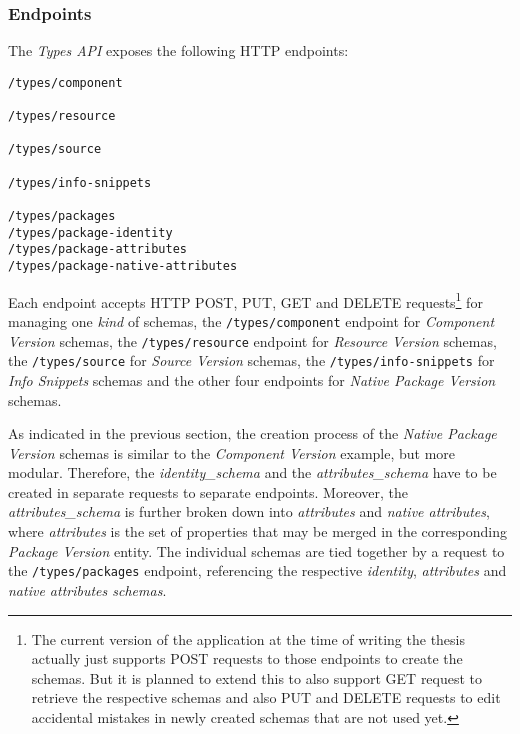 \subsubsection{Endpoints}
The \emph{Types API} exposes the following HTTP endpoints:\\

\begin{lstlisting}[caption=Types API Endpoints, captionpos=b, label=lst:TypesEndpoints]
/types/component

/types/resource

/types/source

/types/info-snippets

/types/packages
/types/package-identity
/types/package-attributes
/types/package-native-attributes
\end{lstlisting}

Each endpoint accepts HTTP POST, PUT, GET and DELETE requests\footnote{The current version of the application at the time of writing the thesis actually just supports POST requests to those endpoints to create the schemas. But it is planned to extend this to also support GET request to retrieve the respective schemas and also PUT and DELETE requests to edit accidental mistakes in newly created schemas that are not used yet.} for managing one \emph{kind} of schemas, the \lstinline|/types/component| endpoint for \emph{Component Version} schemas, the \lstinline|/types/resource| endpoint for \emph{Resource Version} schemas, the \lstinline|/types/source| for \emph{Source Version} schemas, the \lstinline|/types/info-snippets| for \emph{Info Snippets} schemas and the other four endpoints for \emph{Native Package Version} schemas.\par
As indicated in the previous section, the creation process of the \emph{Native Package Version} schemas is similar to the \emph{Component Version} example, but more modular. Therefore, the \emph{identity\_schema} and the \emph{attributes\_schema} have to be created in separate requests to separate endpoints. Moreover, the \emph{attributes\_schema} is further broken down into \emph{attributes} and \emph{native attributes}, where \emph{attributes} is the set of properties that may be merged in the corresponding \emph{Package Version} entity. The individual schemas are tied together by a request to the \lstinline|/types/packages| endpoint, referencing the respective \emph{identity}, \emph{attributes} and \emph{native attributes schemas}.\\

